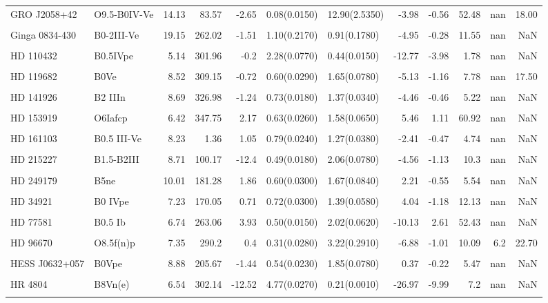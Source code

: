 \begin{longtable}{llrrrllrrrrr}
GRO J2058+42 & O9.5-B0IV-Ve & 14.13 & 83.57 & -2.65 & 0.08(0.0150) & 12.90(2.5350) & -3.98 & -0.56 & 52.48 & nan & 18.00 \\ \\
Ginga 0834-430 & B0-2III-Ve & 19.15 & 262.02 & -1.51 & 1.10(0.2170) & 0.91(0.1780) & -4.95 & -0.28 & 11.55 & nan & NaN \\ \\
HD 110432 & B0.5IVpe & 5.14 & 301.96 & -0.2 & 2.28(0.0770) & 0.44(0.0150) & -12.77 & -3.98 & 1.78 & nan & NaN \\ \\
HD 119682 & B0Ve & 8.52 & 309.15 & -0.72 & 0.60(0.0290) & 1.65(0.0780) & -5.13 & -1.16 & 7.78 & nan & 17.50 \\ \\
HD 141926 & B2 IIIn & 8.69 & 326.98 & -1.24 & 0.73(0.0180) & 1.37(0.0340) & -4.46 & -0.46 & 5.22 & nan & NaN \\ \\
HD 153919 & O6Iafcp & 6.42 & 347.75 & 2.17 & 0.63(0.0260) & 1.58(0.0650) & 5.46 & 1.11 & 60.92 & nan & NaN \\ \\
HD 161103 & B0.5 III-Ve & 8.23 & 1.36 & 1.05 & 0.79(0.0240) & 1.27(0.0380) & -2.41 & -0.47 & 4.74 & nan & NaN \\ \\
HD 215227 & B1.5-B2III & 8.71 & 100.17 & -12.4 & 0.49(0.0180) & 2.06(0.0780) & -4.56 & -1.13 & 10.3 & nan & NaN \\ \\
HD 249179 & B5ne & 10.01 & 181.28 & 1.86 & 0.60(0.0300) & 1.67(0.0840) & 2.21 & -0.55 & 5.54 & nan & NaN \\ \\
HD 34921 & B0 IVpe & 7.23 & 170.05 & 0.71 & 0.72(0.0300) & 1.39(0.0580) & 4.04 & -1.18 & 12.13 & nan & NaN \\ \\
HD 77581 & B0.5 Ib & 6.74 & 263.06 & 3.93 & 0.50(0.0150) & 2.02(0.0620) & -10.13 & 2.61 & 52.43 & nan & NaN \\ \\
HD 96670 & O8.5f(n)p & 7.35 & 290.2 & 0.4 & 0.31(0.0280) & 3.22(0.2910) & -6.88 & -1.01 & 10.09 & 6.2 & 22.70 \\ \\
HESS J0632+057 & B0Vpe & 8.88 & 205.67 & -1.44 & 0.54(0.0230) & 1.85(0.0780) & 0.37 & -0.22 & 5.47 & nan & NaN \\ \\
HR 4804 & B8Vn(e) & 6.54 & 302.14 & -12.52 & 4.77(0.0270) & 0.21(0.0010) & -26.97 & -9.99 & 7.2 & nan & NaN \\ \\

\end{longtable}
